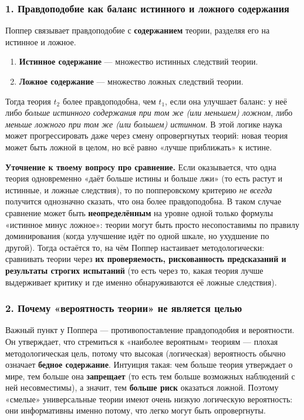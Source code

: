 \documentclass[a4paper,12pt]{article}
\begin{document}
\subsubsection*{1. Правдоподобие как баланс истинного и ложного содержания}

Поппер связывает правдоподобие с \textbf{содержанием} теории, разделяя его на истинное и ложное.
\begin{enumerate}
    \item \textbf{Истинное содержание} --- множество истинных следствий теории.
    \item \textbf{Ложное содержание} --- множество ложных следствий теории.
\end{enumerate}
Тогда теория $t_2$ более правдоподобна, чем $t_1$, если она улучшает баланс: у неё либо \emph{больше истинного содержания при том же (или меньшем) ложном}, либо \emph{меньше ложного при том же (или большем) истинном}. В этой логике наука может прогрессировать даже через смену опровергнутых теорий: новая теория может быть ложной в целом, но всё равно «лучше приближать» к истине.

\textbf{Уточнение к твоему вопросу про сравнение.} Если оказывается, что одна теория одновременно «даёт больше истины и больше лжи» (то есть растут и истинные, и ложные следствия), то по попперовскому критерию \emph{не всегда} получится однозначно сказать, что она более правдоподобна. В таком случае сравнение может быть \textbf{неопределённым} на уровне одной только формулы «истинное минус ложное»: теории могут быть просто несопоставимы по правилу доминирования (когда улучшение идёт по одной шкале, но ухудшение по другой). Тогда остаётся то, на чём Поппер настаивает методологически: сравнивать теории через \textbf{их проверяемость, рискованность предсказаний и результаты строгих испытаний} (то есть через то, какая теория лучше выдерживает критику и где именно обнаруживаются её ложные следствия).

\subsubsection*{2. Почему «вероятность теории» не является целью}

Важный пункт у Поппера --- противопоставление правдоподобия и вероятности. Он утверждает, что стремиться к «наиболее вероятным» теориям --- плохая методологическая цель, потому что высокая (логическая) вероятность обычно означает \textbf{бедное содержание}. Интуиция такая: чем больше теория утверждает о мире, тем больше она \textbf{запрещает} (то есть тем больше возможных наблюдений с ней несовместимы), а значит, тем \textbf{больше риск} оказаться ложной. Поэтому «смелые» универсальные теории имеют очень низкую логическую вероятность: они информативны именно потому, что легко могут быть опровергнуты.
\end{document}
